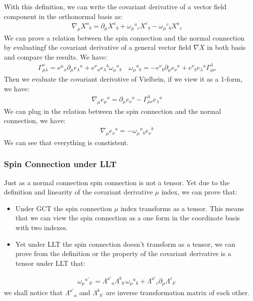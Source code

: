 With this definition, we can write the covariant derivative of a
vector field component in the orthonormal basis as:
\begin{align}
  \nabla_\mu X^a{}_b = \partial_\mu X^a{}_b + \omega_\mu{}^a{}_c
  X^c{}_b - \omega_\mu{}^c{}_b X^a{}_c
\end{align}
We can prove a relation between the spin connection and the normal
connection by evaluatingf the covariant derivative of a general
vector field $ \nabla X $ in both basis and compare the results. We have:
\begin{align}\label{relationconnection}
  \Gamma^\nu_{\mu\lambda} = e^\mu{}_a \partial_\mu e_\lambda{}^a +
  e^\nu{}_a e_\lambda{}^b \omega_\mu{}^a{}_b \quad \omega_\mu{}^a{}_b
  = -e^\nu{}_b \partial_\mu e_\nu{}^a + e^\nu{}_b e_\lambda{}^a
  \Gamma^\lambda_{\mu\nu}
\end{align}
Then we evaluate the covariant derivative of Vielbein, if we view it
as a 1-form, we have:
\begin{align}
  \nabla_\mu e_{\mu}{}^a = \partial_\mu e_\nu{}^a -
  \Gamma^\lambda_{\mu\nu} e_\lambda{}^a
\end{align}
We can plug in the relation between the spin connection and the
normal connection, we have:
\begin{align}
  \nabla_\mu e_{\nu}{}^a = -\omega_\mu{}^a{}_b e_\nu{}^b
\end{align}
We can see that everything is constistent.

\subsubsection{Spin Connection under LLT}

Just as a normal connection spin connection is not a tensor. Yet due
to the definition and linearity of the covariant derivative $ \mu $
index, we can prove that:
\begin{itemize}
  \item Under GCT the spin connection $ \mu $ index transforms as a
    tensor. This means that we can view the spin connection as a one
    form in the coordinate basis with two indexes.
  \item  Yet under LLT the spin connection doesn't transform as a
    tensor, we can prove from the definition or the property of the
    covariant derivative is a tensor under LLT that:
\end{itemize}
\begin{align}
  \omega_\mu{}^{a'}{}_{b'} = \Lambda^{a'}{}_a
  \Lambda^b{}_{b'} \omega_\mu{}^a{}_b + \Lambda^{a'}{}_c \partial_\mu
  \Lambda^c{}_{b'}
\end{align}
we shall notice that $ \Lambda^{a'}{}_a $ and $ \Lambda^b{}_{b'} $
are inverse transformation matrix of each other.

